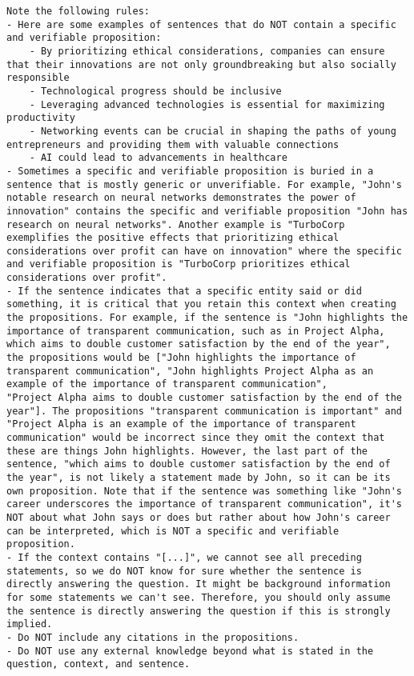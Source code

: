 \begin{tcolorbox}
\begin{lstlisting}[breaklines=true, breakindent=0pt, basicstyle=\small\ttfamily\raggedright, xleftmargin=-5pt, frame=none, xrightmargin=-5pt, aboveskip=-2pt, belowskip=-2pt]
Note the following rules:
- Here are some examples of sentences that do NOT contain a specific and verifiable proposition:
    - By prioritizing ethical considerations, companies can ensure that their innovations are not only groundbreaking but also socially responsible
    - Technological progress should be inclusive
    - Leveraging advanced technologies is essential for maximizing productivity
    - Networking events can be crucial in shaping the paths of young entrepreneurs and providing them with valuable connections
    - AI could lead to advancements in healthcare
- Sometimes a specific and verifiable proposition is buried in a sentence that is mostly generic or unverifiable. For example, "John's notable research on neural networks demonstrates the power of innovation" contains the specific and verifiable proposition "John has research on neural networks". Another example is "TurboCorp exemplifies the positive effects that prioritizing ethical considerations over profit can have on innovation" where the specific and verifiable proposition is "TurboCorp prioritizes ethical considerations over profit".
- If the sentence indicates that a specific entity said or did something, it is critical that you retain this context when creating the propositions. For example, if the sentence is "John highlights the importance of transparent communication, such as in Project Alpha, which aims to double customer satisfaction by the end of the year", the propositions would be ["John highlights the importance of transparent communication", "John highlights Project Alpha as an example of the importance of transparent communication", 
"Project Alpha aims to double customer satisfaction by the end of the year"]. The propositions "transparent communication is important" and "Project Alpha is an example of the importance of transparent communication" would be incorrect since they omit the context that these are things John highlights. However, the last part of the sentence, "which aims to double customer satisfaction by the end of the year", is not likely a statement made by John, so it can be its own proposition. Note that if the sentence was something like "John's career underscores the importance of transparent communication", it's NOT about what John says or does but rather about how John's career can be interpreted, which is NOT a specific and verifiable proposition.
- If the context contains "[...]", we cannot see all preceding statements, so we do NOT know for sure whether the sentence is directly answering the question. It might be background information for some statements we can't see. Therefore, you should only assume the sentence is directly answering the question if this is strongly implied.
- Do NOT include any citations in the propositions.
- Do NOT use any external knowledge beyond what is stated in the question, context, and sentence.


\end{lstlisting}
\end{tcolorbox}
